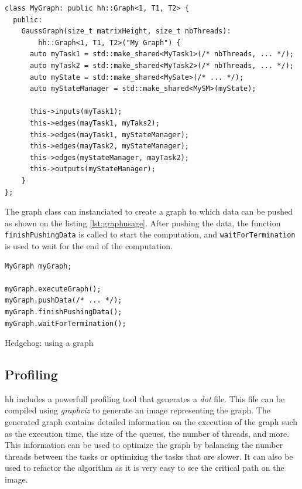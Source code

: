 \begin{listing}[ht!]
\begin{verbatim}
class MyGraph: public hh::Graph<1, T1, T2> {
  public:
    GaussGraph(size_t matrixHeight, size_t nbThreads):
        hh::Graph<1, T1, T2>("My Graph") {
      auto myTask1 = std::make_shared<MyTask1>(/* nbThreads, ... */);
      auto myTask2 = std::make_shared<MyTask2>(/* nbThreads, ... */);
      auto myState = std::make_shared<MySate>(/* ... */);
      auto myStateManager = std::make_shared<MySM>(myState);

      this->inputs(myTask1);
      this->edges(mayTask1, myTaks2);
      this->edges(mayTask1, myStateManager);
      this->edges(mayTask2, myStateManager);
      this->edges(myStateManager, mayTask2);
      this->outputs(myStateManager);
    }
};
\end{verbatim}
\label{lst:graph}
\end{listing}

The graph class can instanciated to create a graph to which data can be pushed
as shown on the listing \ref{lst:graphusage}. After pushing the data, the
function \texttt{finishPushingData} is called to start the computation, and
\texttt{waitForTermination} is used to wait for the end of the computation.

\begin{listing}[ht!]
\begin{verbatim}
MyGraph myGraph;

myGraph.executeGraph();
myGraph.pushData(/* ... */);
myGraph.finishPushingData();
myGraph.waitForTermination();
\end{verbatim}
\caption{Hedgehog: using a graph}
\label{lst:graphusage}
\end{listing}

\subsection{Profiling}

\gls{hh} includes a powerfull profiling tool that generates a \textit{dot} file.
This file can be compiled using \textit{graphviz} to generate an image
representing the graph. The generated graph contains detailed information on the
execution of the graph such as the execution time, the size of the queues, the
number of threads, and more. This information can be used to optimize the graph by
balancing the number threads between the tasks or optimizing the tasks that are
slower. It can also be used to refactor the algorithm as it is very easy to see
the critical path on the image.


